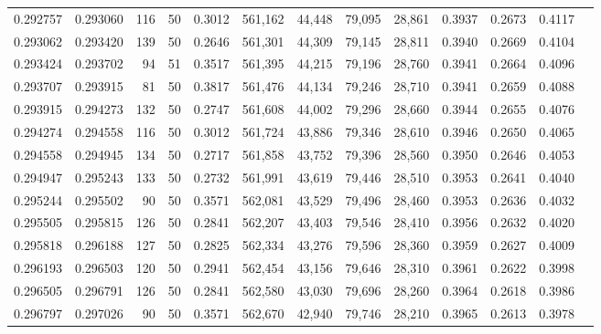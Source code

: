 \begin{tabular}{rrrrrrrrrrrrr}
0.292757 & 0.293060 &   116 &  50 &                                     0.3012 & 561,162 &  44,448 &  79,095 &  28,861 & 0.3937 & 0.2673 & 0.4117 \\
0.293062 & 0.293420 &   139 &  50 &                                     0.2646 & 561,301 &  44,309 &  79,145 &  28,811 & 0.3940 & 0.2669 & 0.4104 \\
0.293424 & 0.293702 &    94 &  51 &                                     0.3517 & 561,395 &  44,215 &  79,196 &  28,760 & 0.3941 & 0.2664 & 0.4096 \\
0.293707 & 0.293915 &    81 &  50 &                                     0.3817 & 561,476 &  44,134 &  79,246 &  28,710 & 0.3941 & 0.2659 & 0.4088 \\
0.293915 & 0.294273 &   132 &  50 &                                     0.2747 & 561,608 &  44,002 &  79,296 &  28,660 & 0.3944 & 0.2655 & 0.4076 \\
0.294274 & 0.294558 &   116 &  50 &                                     0.3012 & 561,724 &  43,886 &  79,346 &  28,610 & 0.3946 & 0.2650 & 0.4065 \\
0.294558 & 0.294945 &   134 &  50 &                                     0.2717 & 561,858 &  43,752 &  79,396 &  28,560 & 0.3950 & 0.2646 & 0.4053 \\
0.294947 & 0.295243 &   133 &  50 &                                     0.2732 & 561,991 &  43,619 &  79,446 &  28,510 & 0.3953 & 0.2641 & 0.4040 \\
0.295244 & 0.295502 &    90 &  50 &                                     0.3571 & 562,081 &  43,529 &  79,496 &  28,460 & 0.3953 & 0.2636 & 0.4032 \\
0.295505 & 0.295815 &   126 &  50 &                                     0.2841 & 562,207 &  43,403 &  79,546 &  28,410 & 0.3956 & 0.2632 & 0.4020 \\
0.295818 & 0.296188 &   127 &  50 &                                     0.2825 & 562,334 &  43,276 &  79,596 &  28,360 & 0.3959 & 0.2627 & 0.4009 \\
0.296193 & 0.296503 &   120 &  50 &                                     0.2941 & 562,454 &  43,156 &  79,646 &  28,310 & 0.3961 & 0.2622 & 0.3998 \\
0.296505 & 0.296791 &   126 &  50 &                                     0.2841 & 562,580 &  43,030 &  79,696 &  28,260 & 0.3964 & 0.2618 & 0.3986 \\
0.296797 & 0.297026 &    90 &  50 &                                     0.3571 & 562,670 &  42,940 &  79,746 &  28,210 & 0.3965 & 0.2613 & 0.3978 \\

\end{tabular}
